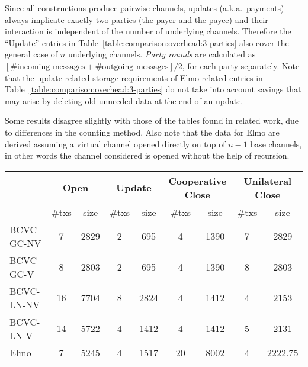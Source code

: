   Since all constructions produce pairwise channels, updates (a.k.a.\ payments)
  always implicate exactly two parties (the payer and the payee) and
  their interaction is independent of the number of underlying channels.
  Therefore the ``Update'' entries in
  Table~\ref{table:comparison:overhead:3-parties} also cover the general case of
  $n$ underlying channels. \emph{Party rounds} are calculated as
  $[\#\text{incoming messages} + \#\text{outgoing messages}]/2$, for each party
  separately. Note that the update-related storage requirements of Elmo-related
  entries in Table~\ref{table:comparison:overhead:3-parties} do not take into
  account savings that may arise by deleting old unneeded data at the end of an
  update.

  Some results disagree slightly with those of the tables found in related work,
  due to differences in the counting method. Also note that the data for Elmo
  are derived assuming a virtual channel opened directly on top of $n-1$ base
  channels, in other words the channel considered is opened without the help of
  recursion.

  \begin{table*}
    \begin{minipage}{\textwidth}
    \begin{center}
    \begin{tabular}{|l|c|c|c|c|c|c|c|c|}
    \hline
              & \multicolumn{2}{|c|}{Open}
              & \multicolumn{2}{|c|}{Update}
              & \multicolumn{2}{|c|}{Cooperative Close}
              & \multicolumn{2}{|c|}{Unilateral Close} \\
    \hline
              & \#txs & size & \#txs & size & \#txs & size & \#txs & size \\
    \hline
    BCVC-GC-NV
              & 7 & 2829 & 2 & 695 & 4 & 1390 & 7 & 2829 \\
    \hline
    BCVC-GC-V & 8 & 2803 & 2 & 695 & 4 & 1390 & 8 & 2803 \\
    \hline
    BCVC-LN-NV
              & 16 & 7704 & 8 & 2824 & 4 & 1412 & 4 & 2153 \\
    \hline
    BCVC-LN-V & 14 & 5722 & 4 & 1412 & 4 & 1412 & 5 & 2131 \\
    \hline
    Elmo      & 7 & 5245 & 4 & 1517 & 20 & 8002 & 4 & 2222.75 \\
    \hline
    \end{tabular}
    \end{center}
    \end{minipage}
    \caption{Efficiency comparison of Elmo and BCVC~\cite{cryptoeprint:2020:554}}
    \label{table:comparison:overhead:3-parties}
  \end{table*}


